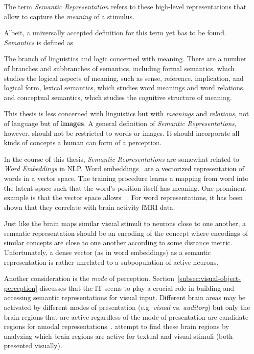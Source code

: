 The term \textit{Semantic Representation} refers to these high-level representations that allow to capture the \textit{meaning} of a stimulus.

Albeit, a universally accepted definition for this term yet has to be found.
\textit{Semantics} is defined as \citep{lexico}
\begin{displayquote}
    The branch of linguistics and logic concerned with meaning. There are a number of branches and subbranches of semantics, including formal semantics, which studies the logical aspects of meaning, such as sense, reference, implication, and logical form, lexical semantics, which studies word meanings and word relations, and conceptual semantics, which studies the cognitive structure of meaning.
\end{displayquote}
This thesis is less concerned with linguistics but with \textit{meanings} and \textit{relations}, not of language but of \textbf{images}.
A general definition of \textit{Semantic Representations}, however, should not be restricted to words or images.
It should incorporate all kinds of concepts a human can form of a perception.

In the course of this thesis, \textit{Semantic Representations} are somewhat related to \textit{Word Embeddings} in \ac{NLP}.
Word embeddings~\citep{mikolov2013efficient} are a vectorized representation of words in a vector space.
The training procedure learns a mapping from word into the latent space such that the word's position itself has meaning.
One prominent example is that the vector space allows ~\citep{mikolov2013efficient}.
For word representations, it has been shown that they correlate with brain activity fMRI data\citep{ruan2016exploring, anderson2013words}.

Just like the brain maps similar visual stimuli to neurons close to one another, a semantic representation should be an encoding of the concept where encodings of similar concepts are close to one another according to some distance metric.
Unfortunately, a dense vector (as in word embeddings) as a semantic representation is rather unrelated to a subpopulation of active neurons.

Another consideration is the \textit{mode} of perception.
Section~\ref{subsec:visual-object-perception} discusses that the \ac{IT} seems to play a crucial role in building and accessing semantic representations for visual input.
Different brain areas may be activated by different modes of presentation (e.g. \textit{visual} vs. \textit{auditory}) but only the brain regions that are active regardless of the mode of presentation are candidate regions for amodal representations~\citep{fairhall2013brain}.
\citet{fairhall2013brain} attempt to find these brain regions by analyzing which brain regions are active for textual and visual stimuli (both presented visually).

